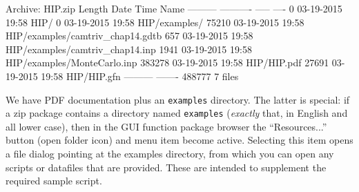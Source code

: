 \documentclass[oneside]{book}
\begin{document}
\begin{code}
Archive:  HIP.zip
  Length      Date    Time    Name
---------  ---------- -----   ----
        0  03-19-2015 19:58   HIP/
        0  03-19-2015 19:58   HIP/examples/
    75210  03-19-2015 19:58   HIP/examples/camtriv_chap14.gdtb
      657  03-19-2015 19:58   HIP/examples/camtriv_chap14.inp
     1941  03-19-2015 19:58   HIP/examples/MonteCarlo.inp
   383278  03-19-2015 19:58   HIP/HIP.pdf
    27691  03-19-2015 19:58   HIP/HIP.gfn
---------                     -------
   488777                     7 files
\end{code}

We have PDF documentation plus an \texttt{examples} directory. The
latter is special: if a zip package contains a directory named
\texttt{examples} (\textit{exactly} that, in English and all lower
case), then in the GUI function package browser the ``Resources...''
button (open folder icon) and menu item become active. Selecting this
item opens a file dialog pointing at the examples directory, from
which you can open any scripts or datafiles that are provided. These
are intended to supplement the required sample script.



\end{document}
